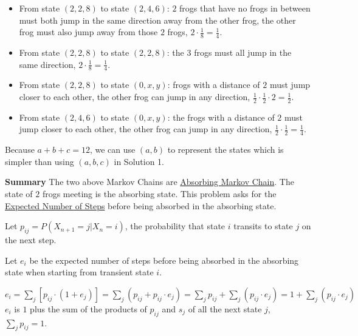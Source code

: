 \begin{enumerate}
            \begin{itemize}
        \item From state $(2, 2, 8)$ to state $(2, 4, 6)$: $2$ frogs that have no frogs in between must both jump in the same direction away from the other frog, the other frog must also jump away from those $2$ frogs, $2 \cdot \frac18 = \frac14$.
            \end{itemize}
            
            \begin{itemize}
        \item From state $(2, 2, 8)$ to state $(2, 2, 8)$: the $3$ frogs must all jump in the same direction, $2 \cdot \frac18 = \frac14$.
            \end{itemize}
            
            \begin{itemize}
        \item From state $(2, 2, 8)$ to state $(0, x, y)$: frogs with a distance of $2$ must jump closer to each other, the other frog can jump in any direction, $\frac12 \cdot \frac12 \cdot 2 = \frac12$.
            \end{itemize}
            
            \begin{itemize}
        \item From state $(2, 4, 6)$ to state $(0, x, y)$: the frogs with a distance of $2$ must jump closer to each other, the other frog can jump in any direction, $\frac12 \cdot \frac12 = \frac14$.
            \end{itemize}
            Because $a + b + c = 12$, we can use $(a, b)$ to represent the states which is simpler than using $(a, b, c)$ in Solution 1.

 \textbf{Summary} The two above Markov Chains are \href{https://en.wikipedia.org/wiki/Absorbing\_Markov\_chain}{Absorbing Markov Chain}. The state of $2$ frogs meeting is the absorbing state. This problem asks for the \href{https://en.wikipedia.org/wiki/Absorbing\_Markov\_chain\#Expected\_number\_of\_steps}{Expected Number of Steps} before being absorbed in the absorbing state.

 Let $p_{ij} = P(X_{n+1} = j | X_n = i)$, the probability that state $i$ transits to state $j$ on the next step. 

 Let $e_i$ be the expected number of steps before being absorbed in the absorbing state when starting from transient state $i$.

 $e_i = \sum_{j} [p_{ij} \cdot ( 1 + e_{j})] = \sum_{j} (p_{ij} + p_{ij} \cdot e_{j}) = \sum_{j} p_{ij} + \sum_{j} (p_{ij} \cdot e_{j}) = 1 + \sum_{j} (p_{ij} \cdot e_{j})$
$e_i$ is $1$ plus the sum of the products of $p_{ij}$ and $s_j$ of all the next state $j$, $\sum_{j} p_{ij} = 1$.


\end{enumerate}
